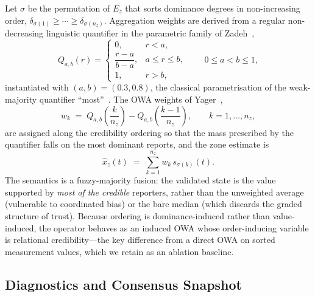 \documentclass[preprint,11pt]{elsarticle}
\begin{document}
Let $\sigma$ be the permutation of $E_z$ that sorts dominance degrees
in non-increasing order, $\delta_{\sigma(1)}\geq\cdots\geq
\delta_{\sigma(n_z)}$. Aggregation weights are derived from a regular
non-decreasing linguistic quantifier in the parametric family of
Zadeh~\cite{zadeh1983},
\begin{equation}
Q_{a,b}(r)=
\begin{cases}
0, & r<a,\\[2pt]
\dfrac{r-a}{b-a}, & a\leq r\leq b,\\[6pt]
1, & r>b,
\end{cases}
\qquad 0\le a<b\le 1,
\label{eq:quantifier}
\end{equation}
instantiated with $(a,b)=(0.3,0.8)$, the classical parametrisation of
the weak-majority quantifier ``most''~\cite{herrera1996,
herreraviedma2002}. The OWA weights of Yager~\cite{yager1988},
\begin{equation}
w_k \;=\; Q_{a,b}\!\left(\frac{k}{n_z}\right)-
Q_{a,b}\!\left(\frac{k-1}{n_z}\right),
\qquad k=1,\dots,n_z,
\label{eq:owaweights}
\end{equation}
are assigned along the credibility ordering so that the mass prescribed
by the quantifier falls on the most dominant reports, and the zone
estimate is
\begin{equation}
\hat{x}_z(t)\;=\;\sum_{k=1}^{n_z} w_k\, s_{\sigma(k)}(t).
\label{eq:estimate}
\end{equation}
The semantics is a fuzzy-majority fusion: the validated state is the
value supported by \emph{most of the credible} reporters, rather than
the unweighted average (vulnerable to coordinated bias) or the bare
median (which discards the graded structure of trust). Because ordering
is dominance-induced rather than value-induced, the operator behaves as
an induced OWA whose order-inducing variable is relational
credibility---the key difference from a direct OWA on sorted
measurement values, which we retain as an ablation baseline.

\subsection{Diagnostics and Consensus Snapshot}
\label{sec:snapshot}
\end{document}
